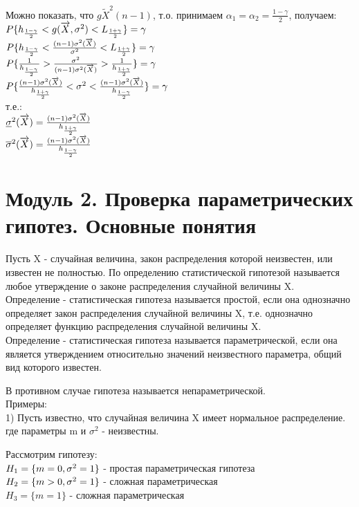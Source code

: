 Можно показать, что $g \tilde X^2 (n - 1)$, т.о. принимаем $\alpha_1 = \alpha_2 = \frac{1 - \gamma}{2}$, получаем:\\
$P\{h_{\frac{1 - \gamma}{2}} < g(\overrightarrow{X}, \sigma^2 ) < L_{\frac{1 + \gamma}{2}}\} = \gamma$\\
$P\{h_{\frac{1 - \gamma}{2}} < \frac{(n-1)\sigma^2 (\overrightarrow{X})}{\sigma^2} < L_{\frac{1 + \gamma}{2}}\} = \gamma$\\
$P\{\frac{1}{h_{\frac{1 - \gamma}{2}}} > \frac{\sigma^2}{(n-1)\sigma^2 (\overrightarrow{X})} > \frac{1}{h_{\frac{1 + \gamma}{2}}}\} = \gamma$\\
$P\{\frac{(n-1)\sigma^2 (\overrightarrow{X})}{h_{\frac{1 + \gamma}{2}}} < \sigma^2 < \frac{(n-1)\sigma^2 (\overrightarrow{X})}{h_{\frac{1 - \gamma}{2}}}\} = \gamma$\\
т.е.:\\
$\underline{\sigma}^2 (\overrightarrow{X}) = \frac{(n-1)\sigma^2 (\overrightarrow{X})}{h_{\frac{1 + \gamma}{2}}}$\\
$\overline{\sigma}^2 (\overrightarrow{X}) = \frac{(n-1)\sigma^2 (\overrightarrow{X})}{h_{\frac{1 - \gamma}{2}}}$\\

\section{Модуль 2. Проверка параметрических гипотез. Основные понятия}
Пусть X - случайная величина, закон распределения которой неизвестен, или известен не полностью. По определению статистической гипотезой называется любое утверждение о законе распределения случайной величины X.\\

Определение - статистическая гипотеза называется простой, если она однозначно определяет закон распределения случайной величины X, т.е. однозначно определяет функцию распределения случайной величины X.\\

Определение - статистическая гипотеза называется параметрической, если она является утверждением относительно значений неизвестного параметра, общий вид которого известен. 

В противном случае гипотеза называется непараметрической.\\

Примеры:\\
1) Пусть известно, что случайная величина X имеет нормальное распределение. где параметры m и $\sigma^2$ - неизвестны. 

Рассмотрим гипотезу:\\
$H_1  = \{m = 0, \sigma^2 = 1\}$ - простая параметрическая гипотеза\\
$H_2 = \{m > 0, \sigma^2 = 1\}$ - сложная параметрическая\\
$H_3 = \{m = 1\}$ - сложная параметрическая\\

